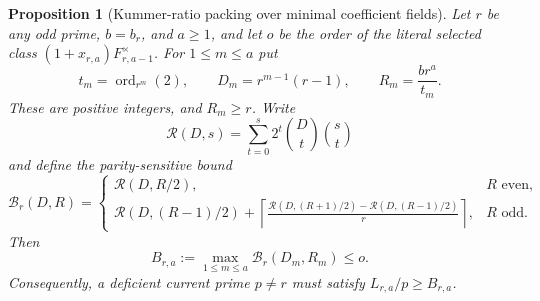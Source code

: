 \documentclass[11pt]{article}
\newtheorem{proposition}[theorem]{Proposition}
\theoremstyle{definition}
\theoremstyle{remark}
\begin{document}
\begin{proposition}[Kummer-ratio packing over minimal coefficient fields]
\label{prop:o-ratio-packing}
Let $r$ be any odd prime, $b=b_r$, and $a\ge1$, and let
$o$ be the order of the literal selected class
$(1+x_{r,a})F_{r,a-1}^{\times}$.  For $1\le m\le a$ put
\[
 t_m=\operatorname{ord}_{r^m}(2),\qquad
 D_m=r^{m-1}(r-1),\qquad
 R_m=\frac{br^a}{t_m}.
\]
These are positive integers, and $R_m\ge r$.  Write
\[
 \mathcal R(D,s)=\sum_{t=0}^s2^t\binom Dt\binom st
\]
and define the parity-sensitive bound
\[
 \mathcal B_r(D,R)=
 \begin{cases}
  \mathcal R(D,R/2),&R\text{ even},\\[2pt]
  \displaystyle\mathcal R(D,(R-1)/2)+
  \left\lceil\frac{
   \mathcal R(D,(R+1)/2)-\mathcal R(D,(R-1)/2)}r\right\rceil,
   &R\text{ odd}.
 \end{cases}
\]
Then
\[
 B_{r,a}:=
 \max_{1\le m\le a}\mathcal B_r(D_m,R_m)\le o.
\]
Consequently, a deficient current prime $p\ne r$ must satisfy
$L_{r,a}/p\ge B_{r,a}$.
\end{proposition}
\end{document}
